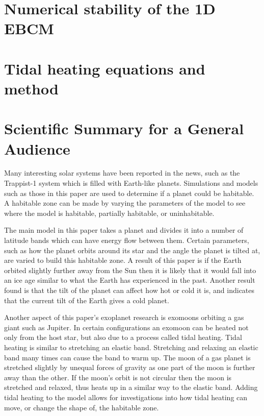 \documentclass[12pt, onecolumn]{revtex4-2}    %
\begin{document}




\clearpage

\appendix

\section{Numerical stability of the 1D EBCM} \label{appx:NumStability}

\section{Tidal heating equations and method} \label{appx:TidalHeatingEquationsMethod}

\clearpage

\section*{Scientific Summary for a General Audience}

Many interesting solar systems have been reported in the news, such as the Trappist-1 system which is filled with Earth-like planets.
Simulations and models such as those in this paper are used to determine if a planet could be habitable.
A habitable zone can be made by varying the parameters of the model to see where the model is habitable, partially habitable, or uninhabitable.

The main model in this paper takes a planet and divides it into a number of latitude bands which can have energy flow between them.
Certain parameters, such as how the planet orbits around its star and the angle the planet is tilted at, are varied to build this habitable zone.
A result of this paper is if the Earth orbited slightly further away from the Sun then it is likely that it would fall into an ice age similar to what the Earth has experienced in the past.
Another result found is that the tilt of the planet can affect how hot or cold it is, and indicates that the current tilt of the Earth gives a cold planet.

Another aspect of this paper's exoplanet research is exomoons orbiting a gas giant such as Jupiter.
In certain configurations an exomoon can be heated not only from the host star, but also due to a process called tidal heating.
Tidal heating is similar to stretching an elastic band.
Stretching and relaxing an elastic band many times can cause the band to warm up.
The moon of a gas planet is stretched slightly by unequal forces of gravity as one part of the moon is further away than the other.
If the moon's orbit is not circular then the moon is stretched and relaxed, thus heats up in a similar way to the elastic band.
Adding tidal heating to the model allows for investigations into how tidal heating can move, or change the shape of, the habitable zone.
\end{document}
